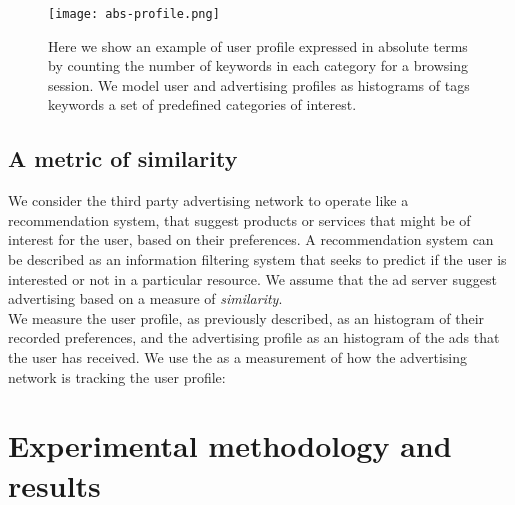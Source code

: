 \documentclass[runningheads,a4paper]{llncs}
\begin{document}
\begin{figure}[!ht]
\centering
\texttt{[image: abs-profile.png]}
\caption{Here we show an example of user profile expressed in absolute terms by counting the number of keywords in each category for a browsing session. We model user and advertising profiles as histograms of tags keywords a set of predefined categories of interest.
\label{abs-profile}}
\end{figure}

\subsection{A metric of similarity}

We consider the third party advertising network to operate like a recommendation system, that suggest products or services that might be of interest for the user, based on their preferences. A recommendation system can be described as an information filtering system that seeks to predict if the user is interested or not in a particular resource. We assume that the ad server suggest advertising based on a measure of \emph{similarity}. 
\\
We measure the user profile, as previously described, as an histogram of their recorded preferences, and the advertising profile as an histogram of the ads that the user has received.  We use the  as a measurement of how the advertising network is tracking the user profile:



\section{Experimental methodology and results}
\end{document}
